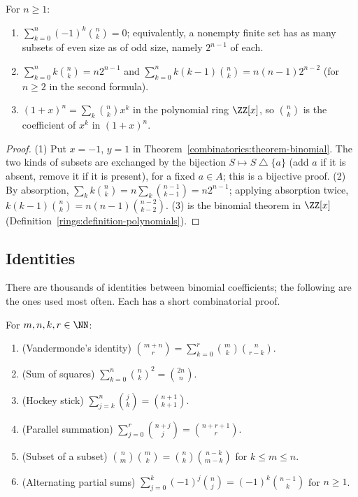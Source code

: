 \begin{corollary}\label{combinatorics:corollary-binomial-consequences}
For $n \geq 1$:
\begin{enumerate}
\item $\sum_{k=0}^{n}(-1)^k\binom{n}{k} = 0$; equivalently, a nonempty finite set has as many subsets of even size as of odd size, namely $2^{n-1}$ of each.
\item $\sum_{k=0}^{n}k\binom{n}{k} = n2^{n-1}$ and $\sum_{k=0}^{n}k(k - 1)\binom{n}{k} = n(n - 1)2^{n-2}$ (for $n \geq 2$ in the second formula).
\item $(1 + x)^n = \sum_k\binom{n}{k}x^k$ in the polynomial ring $\ZZ[x]$, so $\binom{n}{k}$ is the coefficient of $x^k$ in $(1 + x)^n$.
\end{enumerate}
\end{corollary}

\begin{proof}
(1) Put $x = -1$, $y = 1$ in Theorem~\ref{combinatorics:theorem-binomial}. The two kinds of subsets are exchanged by the bijection $S \mapsto S \bigtriangleup \{a\}$ (add $a$ if it is absent, remove
it if it is present), for a fixed $a \in A$; this is a bijective proof. (2) By absorption, $\sum_kk\binom{n}{k} = n\sum_k\binom{n-1}{k-1} = n2^{n-1}$; applying absorption twice,
$k(k - 1)\binom{n}{k} = n(n - 1)\binom{n-2}{k-2}$. (3) is the binomial theorem in $\ZZ[x]$ (Definition~\ref{rings:definition-polynomials}).
\end{proof}

\subsection{Identities}\label{combinatorics:subsection-binomial-identities}

There are thousands of identities between binomial coefficients; the following are the ones used most often. Each has a short combinatorial proof.

\begin{proposition}\label{combinatorics:proposition-binomial-identities}
For $m, n, k, r \in \NN$:
\begin{enumerate}
\item (Vandermonde's identity) $\binom{m + n}{r} = \sum_{k=0}^{r}\binom{m}{k}\binom{n}{r - k}$.
\item (Sum of squares) $\sum_{k=0}^{n}\binom{n}{k}^2 = \binom{2n}{n}$.
\item (Hockey stick) $\sum_{j=k}^{n}\binom{j}{k} = \binom{n + 1}{k + 1}$.
\item (Parallel summation) $\sum_{j=0}^{r}\binom{n + j}{j} = \binom{n + r + 1}{r}$.
\item (Subset of a subset) $\binom{n}{m}\binom{m}{k} = \binom{n}{k}\binom{n - k}{m - k}$ for $k \leq m \leq n$.
\item (Alternating partial sums) $\sum_{j=0}^{k}(-1)^j\binom{n}{j} = (-1)^k\binom{n - 1}{k}$ for $n \geq 1$.
\end{enumerate}
\end{proposition}

